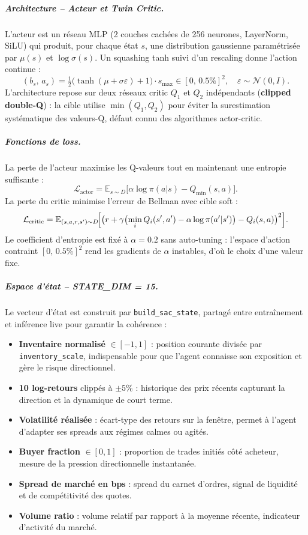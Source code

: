 \documentclass[11pt,a4paper]{article}
\begin{document}
\subparagraph{Architecture -- Acteur et Twin Critic.}
L'acteur est un réseau MLP (2 couches cachées de 256 neurones,
LayerNorm, SiLU) qui produit, pour chaque état $s$, une
distribution gaussienne paramétrisée par $\mu(s)$ et
$\log\sigma(s)$. Un squashing tanh suivi d'un rescaling donne
l'action continue :
\[
(b_s,\,a_s) = \tfrac{1}{2}\bigl(\tanh(\mu + \sigma\varepsilon) + 1\bigr)
\cdot s_{\max} \in [0,\,0.5\%]^2, \quad \varepsilon \sim \mathcal{N}(0,I).
\]
L'architecture repose sur deux réseaux critic $Q_1$ et $Q_2$
indépendants (\textbf{clipped double-Q}) : la cible utilise
$\min(Q_1, Q_2)$ pour éviter la surestimation systématique des
valeurs-Q, défaut connu des algorithmes actor-critic.

\subparagraph{Fonctions de loss.}
La perte de l'acteur maximise les Q-valeurs tout en maintenant
une entropie suffisante :
\[
\mathcal{L}_{\text{actor}} = \mathbb{E}_{s \sim D}
\bigl[\alpha \log \pi(a|s) - Q_{\min}(s,a)\bigr].
\]
La perte du critic minimise l'erreur de Bellman avec cible soft :
\[
\mathcal{L}_{\text{critic}} = \mathbb{E}_{(s,a,r,s') \sim D}
\!\Bigl[\bigl(r + \gamma\bigl(\min_i Q_i(s',a')
- \alpha\log\pi(a'|s')\bigr) - Q_i(s,a)\bigr)^2\Bigr].
\]
Le coefficient d'entropie est fixé à $\alpha = 0.2$ sans
auto-tuning : l'espace d'action contraint $[0,\,0.5\%]^2$ rend
les gradients de $\alpha$ instables, d'où le choix d'une valeur fixe.

\subparagraph{Espace d'état -- STATE\_DIM = 15.}
Le vecteur d'état est construit par \texttt{build\_sac\_state},
partagé entre entraînement et inférence live pour garantir la cohérence :
\begin{itemize}[leftmargin=1.2cm]
  \item \textbf{Inventaire normalisé} $\in [-1,1]$ : position courante
        divisée par \texttt{inventory\_scale}, indispensable pour que
        l'agent connaisse son exposition et gère le risque directionnel.
  \item \textbf{10 log-retours} clippés à $\pm 5\%$ : historique des
        prix récents capturant la direction et la dynamique de court terme.
  \item \textbf{Volatilité réalisée} : écart-type des retours sur la
        fenêtre, permet à l'agent d'adapter ses spreads aux régimes
        calmes ou agités.
  \item \textbf{Buyer fraction} $\in [0,1]$ : proportion de trades
        initiés côté acheteur, mesure de la pression directionnelle
        instantanée.
  \item \textbf{Spread de marché en bps} : spread du carnet d'ordres,
        signal de liquidité et de compétitivité des quotes.
  \item \textbf{Volume ratio} : volume relatif par rapport à la moyenne
        récente, indicateur d'activité du marché.
\end{itemize}
\end{document}
